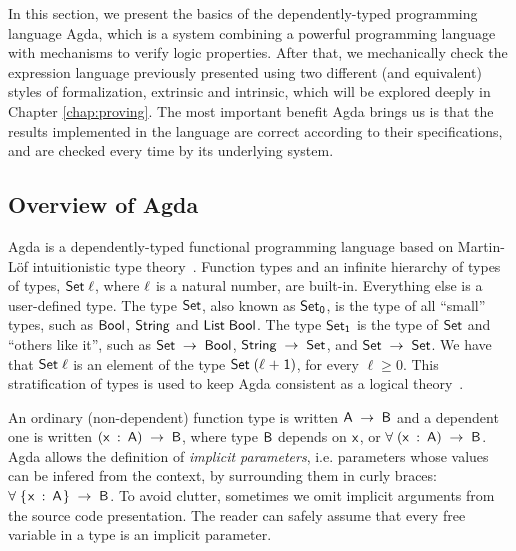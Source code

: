 \documentclass[tese,capa,english]{texufpel}
\renewcommand{\geq}{\geqslant}
\newcommand{\D}[1]{\blue{\mathsf{#1}}}
\newcommand{\F}[1]{\blue{\mathsf{#1}}}
\newcommand{\V}[1]{\black{\mathsf{#1}}}
\newcommand{\N}[1]{\red{\mathsf{#1}}}
\begin{document}
In this section, we present the basics of the dependently-typed programming language Agda, which is a system combining a powerful programming language with mechanisms to verify logic properties. After that, we mechanically check the expression language previously presented using two different (and equivalent) styles of formalization, extrinsic and intrinsic, which will be explored deeply in Chapter \ref{chap:proving}. The most important benefit Agda brings us is that the results implemented in the language are correct according to their specifications, and are checked every time by its underlying system.

\subsection{Overview of Agda}

Agda is a dependently-typed functional programming language based on Martin-L\"of intuitionistic type theory~\cite{Lof98}.  Function types and an infinite hierarchy of types of types, \ensuremath{\D{Set}\;\V{\ell}}, where \ensuremath{\V{\ell}} is a natural number, are built-in. Everything else is a user-defined type. The type \ensuremath{\D{Set}}, also known as \ensuremath{\D{Set}_{\D{0}}}, is the type of all ``small'' types, such as \ensuremath{\D{Bool}}, \ensuremath{\D{String}} and \ensuremath{\D{List}\;\D{Bool}}.  The type \ensuremath{\D{Set}_{\D{1}}} is the type of \ensuremath{\D{Set}} and ``others like it'', such as \ensuremath{\D{Set}\;\to \;\D{Bool}}, \ensuremath{\D{String}\;\to \;\D{Set}}, and \ensuremath{\D{Set}\;\to \;\D{Set}}. We have that \ensuremath{\D{Set}\;\V{\ell}} is an element of the type \ensuremath{\D{Set}\;(\V{\ell}\;\F{+}\;\N{1})}, for every $\ell \geq 0$. This stratification of types is used to keep Agda consistent as a logical theory~\cite{Sorensen2006}.

An ordinary (non-dependent) function type is written \ensuremath{\V{A}\;\to \;\V{B}} and a dependent one is written \ensuremath{(\V{x}\;\mathbin{:}\;\V{A})\;\to \;\V{B}}, where type \ensuremath{\V{B}} depends on
\ensuremath{\V{x}}, or \ensuremath{\V{\forall}\;(\V{x}\;\mathbin{:}\;\V{A})\;\to \;\V{B}}. Agda allows the definition of \emph{implicit parameters}, i.e.  parameters whose values can be infered from the context, by surrounding them in curly braces: \ensuremath{\V{\forall}\;\{\mskip1.5mu \V{x}\;\mathbin{:}\;\V{A}\mskip1.5mu\}\;\to \;\V{B}}. To avoid clutter, sometimes we omit implicit arguments from the source code presentation. The reader can safely assume that every free variable in a type is an implicit parameter.
\end{document}

